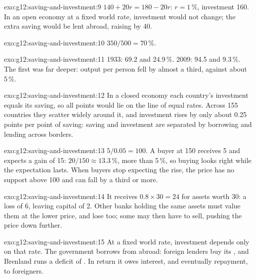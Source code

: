\begin{solution}{exo:g12:saving-and-investment:9}
$140 + 20r = 180 - 20r$: $r = 1\,\%$, investment 160. In an open economy at a fixed world rate, investment would not change; the extra saving would be lent abroad, raising  by 40.
\end{solution}

\begin{solution}{exo:g12:saving-and-investment:10}
$350/500 = 70\,\%$.
\end{solution}

\begin{solution}{exo:g12:saving-and-investment:11}
1933: 69.2 and 24.9\,\%. 2009: 94.5 and 9.3\,\%. The first was far deeper: output per person fell by almost a third, against about 5\,\%.
\end{solution}

\begin{solution}{exo:g12:saving-and-investment:12}
In a closed economy each country's investment equals its saving, so all points would lie on the line of equal rates. Across 155 countries they scatter widely around it, and
investment rises by only about 0.25 points per point of saving: saving and investment are separated by borrowing and lending across borders.
\end{solution}

\begin{solution}{exo:g12:saving-and-investment:13}
 $5/0.05 = 100$. A buyer at 150 receives 5 and expects a gain of 15: $20/150 \approx 13.3\,\%$, more than 5\,\%, so buying looks right while the expectation lasts.
When buyers stop expecting the rise, the price has no support above 100 and can fall by a third or more.
\end{solution}

\begin{solution}{exo:g12:saving-and-investment:14}
It receives $0.8 \times 30 = 24$ for assets worth 30: a loss of 6, leaving capital of 2. Other banks holding the same assets must value them at the lower price, and lose too;
some may then have to sell, pushing the price down further.
\end{solution}

\begin{solution}{exo:g12:saving-and-investment:15}
At a fixed world rate, investment depends only on that rate. The government borrows from abroad: foreign lenders buy its , and Brenland runs a deficit of . In return it owes interest, and eventually repayment, to foreigners.
\end{solution}

